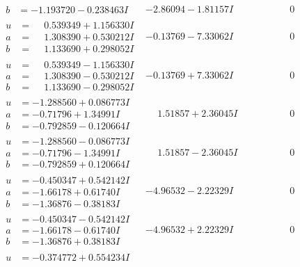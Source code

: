 \documentclass[1p]{elsarticle_modified}
\theoremstyle{definition}
\begin{document}
$$\begin{array}{c|c|c}
\begin{aligned}
b &= -1.193720 - 0.238463 I\end{aligned}
 & -2.86094 - 1.81157 I & \phantom{-0.000000 } 0 \\ \hline\begin{aligned}
u &= \phantom{-}0.539349 + 1.156330 I \\
a &= \phantom{-}1.308390 + 0.530212 I \\
b &= \phantom{-}1.133690 + 0.298052 I\end{aligned}
 & -0.13769 - 7.33062 I & \phantom{-0.000000 } 0 \\ \hline\begin{aligned}
u &= \phantom{-}0.539349 - 1.156330 I \\
a &= \phantom{-}1.308390 - 0.530212 I \\
b &= \phantom{-}1.133690 - 0.298052 I\end{aligned}
 & -0.13769 + 7.33062 I & \phantom{-0.000000 } 0 \\ \hline\begin{aligned}
u &= -1.288560 + 0.086773 I \\
a &= -0.71796 + 1.34991 I \\
b &= -0.792859 - 0.120664 I\end{aligned}
 & \phantom{-}1.51857 + 2.36045 I & \phantom{-0.000000 } 0 \\ \hline\begin{aligned}
u &= -1.288560 - 0.086773 I \\
a &= -0.71796 - 1.34991 I \\
b &= -0.792859 + 0.120664 I\end{aligned}
 & \phantom{-}1.51857 - 2.36045 I & \phantom{-0.000000 } 0 \\ \hline\begin{aligned}
u &= -0.450347 + 0.542142 I \\
a &= -1.66178 + 0.61740 I \\
b &= -1.36876 - 0.38183 I\end{aligned}
 & -4.96532 - 2.22329 I & \phantom{-0.000000 } 0 \\ \hline\begin{aligned}
u &= -0.450347 - 0.542142 I \\
a &= -1.66178 - 0.61740 I \\
b &= -1.36876 + 0.38183 I\end{aligned}
 & -4.96532 + 2.22329 I & \phantom{-0.000000 } 0 \\ \hline\begin{aligned}
u &= -0.374772 + 0.554234 I \\

\end{aligned}
\end{array}$$
\end{document}
